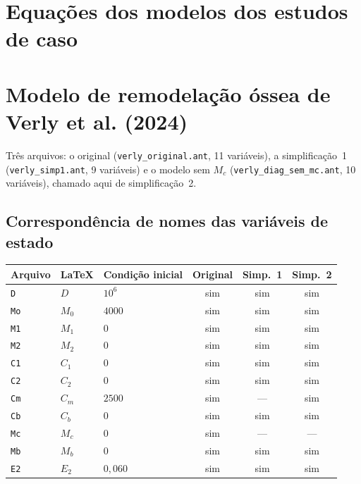 \documentclass[11pt]{article}
\begin{document}
\section*{Equações dos modelos dos estudos de caso}

\section{Modelo de remodelação óssea de Verly et al. (2024)}

Três arquivos: o original (\texttt{verly\_original.ant}, 11 variáveis), a simplificação~1
(\texttt{verly\_simp1.ant}, 9 variáveis) e o modelo sem $M_c$
(\texttt{verly\_diag\_sem\_mc.ant}, 10 variáveis), chamado aqui de simplificação~2.

\subsection{Correspondência de nomes das variáveis de estado}

\begin{longtable}{lllccc}
\toprule
Arquivo & \LaTeX & Condição inicial & Original & Simp.~1 & Simp.~2 \\
\midrule
\endhead
\texttt{D}  & $D$   & $10^{6}$              & sim & sim & sim \\
\texttt{Mo} & $M_0$ & $4000$                & sim & sim & sim \\
\texttt{M1} & $M_1$ & $0$                   & sim & sim & sim \\
\texttt{M2} & $M_2$ & $0$                   & sim & sim & sim \\
\texttt{C1} & $C_1$ & $0$                   & sim & sim & sim \\
\texttt{C2} & $C_2$ & $0$                   & sim & sim & sim \\
\texttt{Cm} & $C_m$ & $2500$                & sim & ---  & sim \\
\texttt{Cb} & $C_b$ & $0$                   & sim & sim & sim \\
\texttt{Mc} & $M_c$ & $0$                   & sim & ---  & --- \\
\texttt{Mb} & $M_b$ & $0$                   & sim & sim & sim \\
\texttt{E2} & $E_2$ & $0{,}060$             & sim & sim & sim \\
\bottomrule
\end{longtable}
\end{document}
